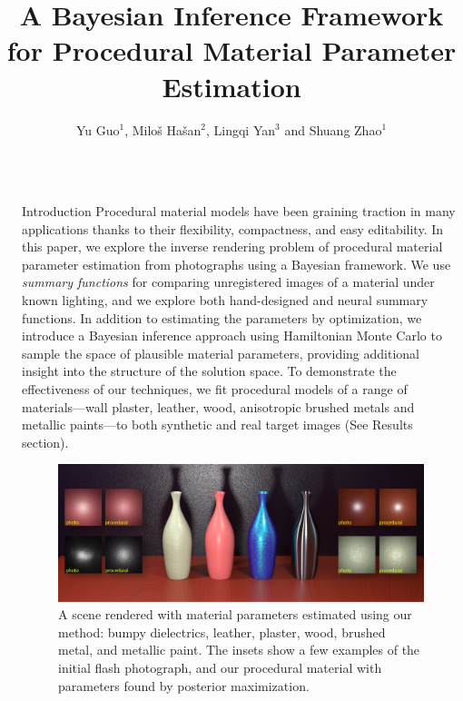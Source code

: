 \documentclass[final]{beamer}
\title{A Bayesian Inference Framework for Procedural Material Parameter Estimation} %
\author{Yu Guo$^1$, Milo\v{s} Ha\v{s}an$^2$, Lingqi Yan$^3$ and Shuang Zhao$^1$} %
\institute{$^1$University of California, Irvine \hspace{2cm}
$^2$Adobe Research \hspace{2cm}
$^3$University of California, Santa Barbara
\vspace{1cm}
} %
\newlength{\sepwid}
\newlength{\twocolwid}
\begin{document}
\begin{frame}[t] %
\vspace{-1.5cm}
\begin{columns}[t] %
    \begin{column}{\sepwid}\end{column} %
    \begin{column}{\twocolwid} %
        \begin{block}{Introduction}
            \large{
                Procedural material models have been graining traction in many applications thanks to their flexibility, compactness, and easy editability.
                In this paper, we explore the inverse rendering problem of procedural material parameter estimation from photographs using a Bayesian framework.
                We use \emph{summary functions} for comparing unregistered images of a material under known lighting, and we explore both hand-designed and neural summary functions. In addition to estimating the parameters by optimization, we introduce a Bayesian inference approach using Hamiltonian Monte Carlo to sample the space of plausible material parameters, providing additional insight into the structure of the solution space.
                To demonstrate the effectiveness of our techniques, we fit procedural models of a range of materials---wall plaster, leather, wood, anisotropic brushed metals and metallic paints---to both synthetic and real target images (See Results section).
                \vspace{1cm}
            }
            
            \begin{figure}
                \includegraphics[width=0.9\linewidth]{images/other/teaser.jpg}
             	\caption{\label{fig:teaser}
             		A scene rendered with material parameters estimated using our method: bumpy dielectrics, leather, plaster, wood, brushed metal, and metallic paint. The insets show a few examples of the initial flash photograph, and our procedural material with parameters found by posterior maximization.}
             \end{figure}
    

\end{block}
\end{column}
\end{columns}
\end{frame}
\end{document}
